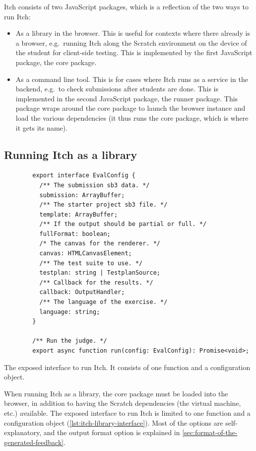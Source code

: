 \documentclass[../main]{subfiles}
\begin{document}
Itch consists of two JavaScript packages, which is a reflection of the two ways to run Itch:

\begin{itemize}
    \item As a library in the browser.
          This is useful for contexts where there already is a browser, e.g.\ running Itch along the Scratch environment on the device of the student for client-side testing.
        This is implemented by the first JavaScript package, the core package.
    \item As a command line tool.
          This is for cases where Itch runs as a service in the backend, e.g.\ to check submissions after students are done.
        This is implemented in the second JavaScript package, the runner package.
        This package wraps around the core package to launch the browser instance and load the various dependencies (it thus runs the core package, which is where it gets its name).
\end{itemize}

\subsection{Running Itch as a library}\label{subsec:running-itch-as-a-library}

\begin{listing}
    \begin{verbatim}
        export interface EvalConfig {
          /** The submission sb3 data. */
          submission: ArrayBuffer;
          /** The starter project sb3 file. */
          template: ArrayBuffer;
          /** If the output should be partial or full. */
          fullFormat: boolean;
          /* The canvas for the renderer. */
          canvas: HTMLCanvasElement;
          /** The test suite to use. */
          testplan: string | TestplanSource;
          /** Callback for the results. */
          callback: OutputHandler;
          /** The language of the exercise. */
          language: string;
        }

        /** Run the judge. */
        export async function run(config: EvalConfig): Promise<void>;
    \end{verbatim}
    \caption{The exposed interface to run Itch. It consists of one function and a configuration object.}\label{lst:itch-library-interface}
\end{listing}

When running Itch as a library, the core package must be loaded into the browser, in addition to having the Scratch dependencies (the virtual machine, etc.) available.
The exposed interface to run Itch is limited to one function and a configuration object (\cref{lst:itch-library-interface}).
Most of the options are self-explanatory, and the output format option is explained in \cref{sec:format-of-the-generated-feedback}.
\end{document}
